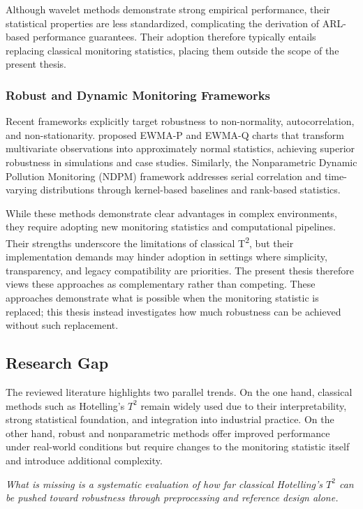 Although wavelet methods demonstrate strong empirical performance, their statistical properties are less standardized, complicating the derivation of \ac{ARL}-based performance guarantees. Their adoption therefore typically entails replacing classical monitoring statistics, placing them outside the scope of the present thesis.

\subsubsection{Robust and Dynamic Monitoring Frameworks}
Recent frameworks explicitly target robustness to non-normality, autocorrelation, and non-stationarity. \cite{Xie2023} proposed EWMA-P and EWMA-Q charts that transform multivariate observations into approximately normal statistics, achieving superior robustness in simulations and case studies. Similarly, the Nonparametric Dynamic Pollution Monitoring (\ac{NDPM}) framework addresses serial correlation and time-varying distributions through kernel-based baselines and rank-based statistics.

While these methods demonstrate clear advantages in complex environments, they require adopting new monitoring statistics and computational pipelines. Their strengths underscore the limitations of classical T\textsuperscript{2}, but their implementation demands may hinder adoption in settings where simplicity, transparency, and legacy compatibility are priorities. The present thesis therefore views these approaches as complementary rather than competing.
These approaches demonstrate what is possible when the monitoring statistic is replaced; this thesis instead investigates how much robustness can be achieved without such replacement.


\subsection{Research Gap}

The reviewed literature highlights two parallel trends. On the one hand, classical methods such as Hotelling’s $T^2$ remain widely used due to their interpretability, strong statistical foundation, and integration into industrial practice. On the other hand, robust and nonparametric methods offer improved performance under real-world conditions but require changes to the monitoring statistic itself and introduce additional complexity.

\textit{What is missing is a systematic evaluation of how far classical Hotelling’s $T^2$ can be pushed toward robustness through preprocessing and reference design alone.}

